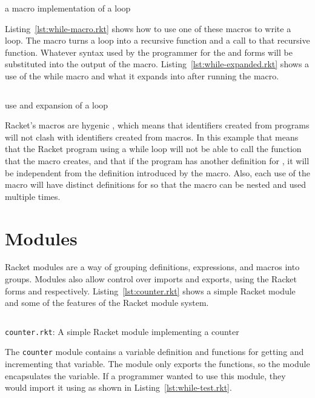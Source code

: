 \begin{listing}
  \inputminted{racket}{listings/while-macro.rkt}
  \caption{a macro implementation of a  loop}
  \label{lst:while-macro.rkt}
\end{listing}
Listing~\ref{lst:while-macro.rkt} shows how to use one of these macros to write a  loop. 
The macro turns a  loop into a recursive function and a call to that recursive function.
Whatever syntax used by the programmer for the  and  forms will be substituted into the output of the macro. 
Listing~\ref{lst:while-expanded.rkt} shows a use of the while macro and what it expands into after running the macro. 
\begin{listing}
  \inputminted{racket}{listings/while-expanded.rkt}
  \caption{use and expansion of a  loop}
  \label{lst:while-expanded.rkt}
\end{listing}
Racket's macros are hygenic \cite{}, which means that identifiers created from programs will not clash with identifiers created from macros. 
In this example that means that the Racket program using a while loop will not be able to call the  function that the macro creates, and that if the program has another definition for , it will be independent from the definition introduced by the macro.
Also, each use of the macro will have distinct definitions for  so that the macro can be nested and used multiple times.
\section{Modules}
Racket modules are a way of grouping definitions, expressions, and macros into groups. 
Modules also allow control over imports and exports, using the Racket forms  and  respectively.
Listing~\ref{lst:counter.rkt} shows a simple Racket module and some of the features of the Racket module system.
\begin{listing}
  \inputminted{racket}{listings/counter.rkt}
  \caption{\texttt{counter.rkt}: A simple Racket module implementing a counter}
  \label{lst:counter.rkt}
\end{listing}
The \texttt{counter} module contains a variable definition and functions for getting and incrementing that variable.
The module only exports the functions, so the module encapsulates the variable.
If a programmer wanted to use this module, they would import it using  as shown in Listing~\ref{lst:while-test.rkt}. 

